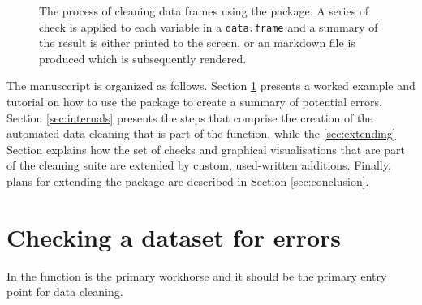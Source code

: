 \documentclass[article]{jss}
\begin{document}
\begin{figure}
\begin{center}
\end{center}
\label{fig:flowchart1}
\caption{The process of cleaning data frames using the 
  package. A series of check is applied to each variable in a
  \texttt{data.frame} and a summary of the result is either printed to
  the screen, or an  markdown file is produced which is
  subsequently rendered.}
\end{figure}


The manusccript is organized as follows. Section \ref{sec:example1}
presents a worked example and tutorial on how to use the 
package to create a summary of potential errors. Section
\ref{sec:internals} presents the steps that comprise the creation of
the automated data cleaning that is part of the  function,
while the \ref{sec:extending} Section explains how the set of checks
and graphical visualisations that are part of the cleaning suite are
extended by custom, used-written additions. Finally, plans for
extending the package are described in Section \ref{sec:conclusion}.




\section{Checking a dataset for errors} \label{sec:example1}

In  the  function is the primary workhorse and it
should be the primary entry point for data cleaning.
\end{document}
